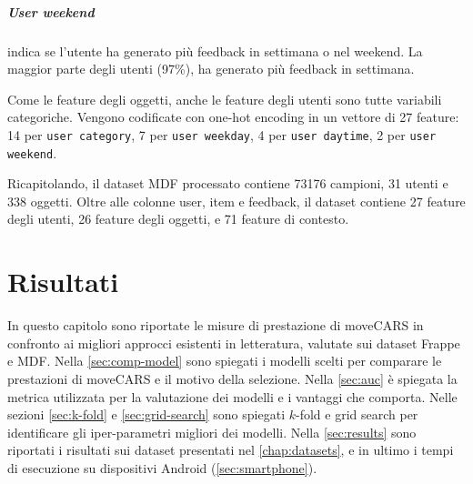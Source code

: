 \documentclass[12pt,italian]{report}
\begin{document}
\paragraph{User weekend} indica se l'utente ha generato più feedback in settimana o nel weekend. La maggior parte degli utenti (97\%), ha generato più feedback in settimana.

\bigskip \noindent
Come le feature degli oggetti, anche le feature degli utenti sono tutte variabili categoriche. Vengono codificate con one-hot encoding in un vettore di 27 feature: 14 per \texttt{user category}, 7 per \texttt{user weekday}, 4 per \texttt{user daytime}, 2 per \texttt{user weekend}.

Ricapitolando, il dataset MDF processato contiene 73176 campioni, 31 utenti e 338 oggetti. Oltre alle colonne user, item e feedback, il dataset contiene  27 feature degli utenti, 26 feature degli oggetti, e 71 feature di contesto.


% 
% 

\chapter{Risultati} \label{chap:risultati}
In questo capitolo sono riportate le misure di prestazione di moveCARS in confronto ai migliori approcci esistenti in letteratura, valutate sui dataset Frappe e MDF. Nella \autoref{sec:comp-model} sono spiegati i modelli scelti per comparare le prestazioni di moveCARS e il motivo della selezione. Nella \autoref{sec:auc} è spiegata la metrica utilizzata per la valutazione dei modelli e i vantaggi che comporta. Nelle sezioni \ref{sec:k-fold} e \ref{sec:grid-search} sono spiegati $k$-fold e grid search per identificare gli iper-parametri migliori dei modelli. Nella \autoref{sec:results} sono riportati i risultati sui dataset presentati nel \autoref{chap:datasets}, e in ultimo i tempi di esecuzione su dispositivi Android (\autoref{sec:smartphone}).
\end{document}

